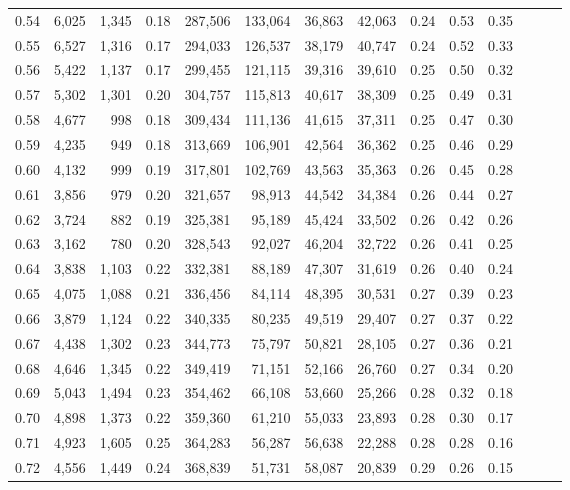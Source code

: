 \begin{tabular}{rrrrrrrrrrrrrr}
0.54 &  6,025 &  1,345 &  0.18 &  287,506 &  133,064 &  36,863 &  42,063 &  0.24 &  0.53 &      0.35 \\
0.55 &  6,527 &  1,316 &  0.17 &  294,033 &  126,537 &  38,179 &  40,747 &  0.24 &  0.52 &      0.33 \\
0.56 &  5,422 &  1,137 &  0.17 &  299,455 &  121,115 &  39,316 &  39,610 &  0.25 &  0.50 &      0.32 \\
0.57 &  5,302 &  1,301 &  0.20 &  304,757 &  115,813 &  40,617 &  38,309 &  0.25 &  0.49 &      0.31 \\
0.58 &  4,677 &    998 &  0.18 &  309,434 &  111,136 &  41,615 &  37,311 &  0.25 &  0.47 &      0.30 \\
0.59 &  4,235 &    949 &  0.18 &  313,669 &  106,901 &  42,564 &  36,362 &  0.25 &  0.46 &      0.29 \\
0.60 &  4,132 &    999 &  0.19 &  317,801 &  102,769 &  43,563 &  35,363 &  0.26 &  0.45 &      0.28 \\
0.61 &  3,856 &    979 &  0.20 &  321,657 &   98,913 &  44,542 &  34,384 &  0.26 &  0.44 &      0.27 \\
0.62 &  3,724 &    882 &  0.19 &  325,381 &   95,189 &  45,424 &  33,502 &  0.26 &  0.42 &      0.26 \\
0.63 &  3,162 &    780 &  0.20 &  328,543 &   92,027 &  46,204 &  32,722 &  0.26 &  0.41 &      0.25 \\
0.64 &  3,838 &  1,103 &  0.22 &  332,381 &   88,189 &  47,307 &  31,619 &  0.26 &  0.40 &      0.24 \\
0.65 &  4,075 &  1,088 &  0.21 &  336,456 &   84,114 &  48,395 &  30,531 &  0.27 &  0.39 &      0.23 \\
0.66 &  3,879 &  1,124 &  0.22 &  340,335 &   80,235 &  49,519 &  29,407 &  0.27 &  0.37 &      0.22 \\
0.67 &  4,438 &  1,302 &  0.23 &  344,773 &   75,797 &  50,821 &  28,105 &  0.27 &  0.36 &      0.21 \\
0.68 &  4,646 &  1,345 &  0.22 &  349,419 &   71,151 &  52,166 &  26,760 &  0.27 &  0.34 &      0.20 \\
0.69 &  5,043 &  1,494 &  0.23 &  354,462 &   66,108 &  53,660 &  25,266 &  0.28 &  0.32 &      0.18 \\
0.70 &  4,898 &  1,373 &  0.22 &  359,360 &   61,210 &  55,033 &  23,893 &  0.28 &  0.30 &      0.17 \\
0.71 &  4,923 &  1,605 &  0.25 &  364,283 &   56,287 &  56,638 &  22,288 &  0.28 &  0.28 &      0.16 \\
0.72 &  4,556 &  1,449 &  0.24 &  368,839 &   51,731 &  58,087 &  20,839 &  0.29 &  0.26 &      0.15 \\

\end{tabular}
